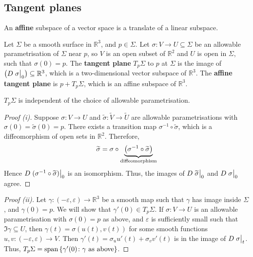 \documentclass[a4paper]{article}
\begin{document}
\subsection{Tangent planes}
An \textbf{affine} subspace of a vector space is a translate of a linear subspace.
\begin{definition}
	Let \( \Sigma \) be a smooth surface in \( \mathbb R^3 \), and \( p \in \Sigma \).
	Let \( \sigma \colon V \to U \subseteq \Sigma \) be an allowable parametrisation of \( \Sigma \) near \( p \), so \( V \) is an open subset of \( \mathbb R^2 \) and \( U \) is open in \( \Sigma \), such that \( \sigma(0) = p \).
	The \textbf{tangent plane} \( T_p \Sigma \) to \( p \) at \( \Sigma \) is the image of \( \qty(D \eval{\sigma}_0) \subseteq \mathbb R^3 \), which is a two-dimensional vector subspace of \( \mathbb R^3 \).
	The \textbf{affine tangent plane} is \( p + T_p \Sigma \), which is an affine subspace of \( \mathbb R^3 \).
\end{definition}
\begin{lemma}
	\( T_p \Sigma \) is independent of the choice of allowable parametrisation.
\end{lemma}

\begin{proof}[Proof (i)]
	Suppose \( \sigma \colon V \to U \) and \( \widetilde \sigma \colon \widetilde V \to \widetilde U \) are allowable parametrisations with \( \sigma(0) = \widetilde \sigma(0) = p \).
	There exists a transition map \( \sigma^{-1} \circ \widetilde \sigma \), which is a diffeomorphism of open sets in \( \mathbb R^2 \).
	Therefore,
	\[
		\widetilde \sigma = \sigma \circ \underbrace{\qty(\sigma^{-1} \circ \widetilde \sigma)}_{\text{diffeomorphism}}
	\]
	Hence \( D\eval{(\sigma^{-1} \circ \widetilde \sigma)}_{0} \) is an isomorphism.
	Thus, the images of \( D \eval{\widetilde \sigma}_0 \) and \( D \eval{\sigma}_0 \) agree.
\end{proof}
\begin{proof}[Proof (ii)]
	Let \( \gamma \colon (-\varepsilon, \varepsilon) \to \mathbb R^3 \) be a smooth map such that \( \gamma \) has image inside \( \Sigma \), and \( \gamma(0) = p \).
	We will show that \( \gamma'(0) \in T_p \Sigma \).
	If \( \sigma \colon V \to U \) is an allowable parametrisation with \( \sigma(0) = p \) as above, and \( \varepsilon \) is sufficiently small such that \( \Im \gamma \subseteq U \), then \( \gamma(t) = \sigma(u(t), v(t)) \) for some smooth functions \( u, v \colon (-\varepsilon, \varepsilon) \to V \).
	Then \( \gamma'(t) = \sigma_u u'(t) + \sigma_v v'(t) \) is in the image of \( D \eval{\sigma}_t \).
	Thus, \( T_p \Sigma = \operatorname{span} \qty{ \gamma'(0) \colon \gamma \text{ as above} } \).
\end{proof}
\end{document}
